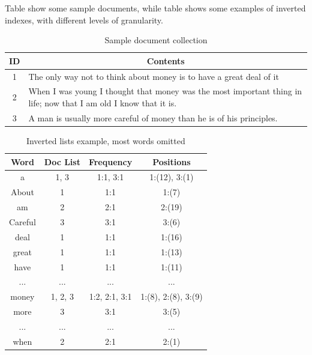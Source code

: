 Table  show some sample documents, while table  shows some examples of inverted indexes, with different levels of granularity.

\begin{table}[ht]
    \begin{center}
        \begin{tabularx}{\textwidth}{|c|X|}
            \hline
            \textbf{ID} & \multicolumn{1}{c|}{\textbf{Contents}}  \\ \hline
            1 & The only way not to think about money is to have a great deal of it \\ \hline
            2 & When I was young I thought that money was the most important thing in life; now that I am old I know that it is. \\ \hline
            3 & A man is usually more careful of money than he is of his principles.\\ \hline
        \end{tabularx}
        \caption{Sample document collection\label{tab:sample_docs}}
    \end{center}
\end{table}

\begin{table}[ht]
    \begin{center}
        \begin{tabular}{|c|c|c|c|}
            \hline
            \textbf{Word} & \textbf{Doc List} & \textbf{Frequency} & \textbf{Positions} \\ \hline
            a & 1, 3 & 1:1, 3:1 & 1:(12), 3:(1) \\ \hline
            About & 1 & 1:1 & 1:(7) \\ \hline
            am & 2 & 2:1 & 2:(19) \\ \hline
            Careful & 3 & 3:1 & 3:(6) \\ \hline
            deal & 1 & 1:1 & 1:(16) \\ \hline
            great & 1 & 1:1 & 1:(13) \\ \hline
            have & 1 & 1:1 & 1:(11) \\ \hline
            ... & ... & ... & ... \\ \hline
            money & 1, 2, 3 & 1:2, 2:1, 3:1 & 1:(8), 2:(8), 3:(9) \\ \hline
            more & 3 & 3:1 & 3:(5) \\ \hline
            ... & ... & ... & ... \\ \hline
            when & 2 & 2:1 & 2:(1) \\ \hline
        \end{tabular}
        \caption{Inverted lists example, most words omitted\label{tab:inverted_lists}} 
    \end{center}
\end{table}


